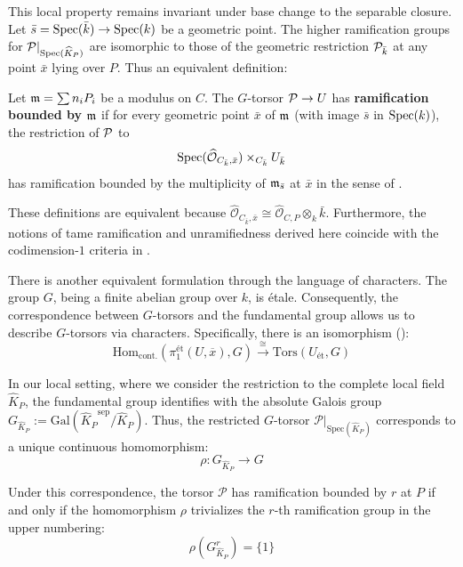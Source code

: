 This local property remains invariant under base change to the separable closure.
Let $\bar{s} = \operatorname{Spec}(\bar{k}) \to \operatorname{Spec}(k)$
be a geometric point.
The higher ramification groups for $\mathcal{P}|_{\operatorname{Spec}(\widehat{K}_P)}$ are isomorphic to those of
the geometric restriction $\mathcal{P}_{\bar{k}}$ at any point $\bar{x}$ lying over $P$.
Thus an equivalent definition:
\begin{definition}
    Let $\mathfrak{m} = \sum n_i P_i$ be a modulus on $C$.
    The $G$-torsor $\mathcal{P} \to U$ has \textbf{ramification bounded by $\mathfrak{m}$}
    if for every geometric point $\bar{x}$ of $\mathfrak{m}$ (with image $\bar{s}$ in $\operatorname{Spec}(k)$),
    the restriction of $\mathcal{P}$ to$$ \operatorname{Spec}(\widehat{\mathcal{O}}_{C_{\bar{k}},\bar{x}}) \times_{C_{\bar{k}}} U_{\bar{k}} $$
    has ramification bounded by the multiplicity of $\mathfrak{m}_{\bar{s}}$ at $\bar{x}$ in the sense of
    .
\end{definition}
These definitions are equivalent because $\widehat{\mathcal{O}}_{C_{\bar{k}},\bar{x}} \cong \widehat{\mathcal{O}}_{C,P} \otimes_k \bar{k}$. Furthermore, the notions of tame ramification and unramifiedness derived here coincide with the codimension-$1$ criteria in .

There is another equivalent formulation through the language of characters.
The group $G$, being a finite abelian group over $k$, is \'etale.
Consequently, the correspondence between $G$-torsors and the fundamental group allows us to describe $G$-torsors
 via characters. Specifically, there is an isomorphism ():
\[ \mathrm{Hom}_{\mathrm{cont.}}(\pi_1^{\text{\'et}}(U, \overline{x}), G) \xrightarrow{\cong} \mathrm{Tors}(U_{\text{\'et}}, G) \]

In our local setting, where we consider the restriction to the complete local field $\widehat{K}_P$,
the fundamental group identifies with the absolute Galois group
$G_{\widehat{K}_P} := \mathrm{Gal}({\widehat{K}_P}^{\mathrm{sep}}/{\widehat{K}_P})$.
Thus, the restricted $G$-torsor $\mathcal{P}|_{\mathrm{Spec}(\widehat{K}_P)}$ corresponds to a unique continuous homomorphism:
\[ \rho : G_{\widehat{K}_P} \to G \]

Under this correspondence, the torsor $\mathcal{P}$ has ramification bounded by $r$ at $P$
if and only if the homomorphism $\rho$ trivializes the $r$-th ramification group in the upper numbering:
\[ \rho(G_{\widehat{K}_P}^r) = \{ 1 \} \]

